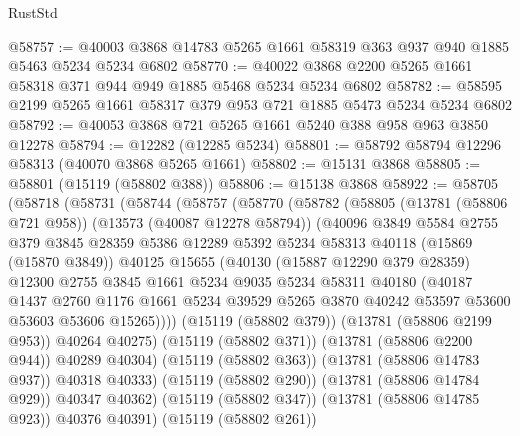 \begin{lexlean}{RustStd}
\begin{coremodule}
@58757 := @40003 @3868 @14783 @5265 @1661 @58319 @363 @937 @940 @1885 @5463 @5234 @5234 @6802
@58770 := @40022 @3868 @2200 @5265 @1661 @58318 @371 @944 @949 @1885 @5468 @5234 @5234 @6802
@58782 := @58595 @2199 @5265 @1661 @58317 @379 @953 @721 @1885 @5473 @5234 @5234 @6802
@58792 := @40053 @3868 @721 @5265 @1661 @5240 @388 @958 @963 @3850 @12278
@58794 := @12282 (@12285 @5234)
@58801 := @58792 @58794 @12296 @58313 (@40070 @3868 @5265 @1661)
@58802 := @15131 @3868
@58805 := @58801 (@15119 (@58802 @388))
@58806 := @15138 @3868
@58922 := @58705
    (@58718
      (@58731
        (@58744
          (@58757
            (@58770
              (@58782
                (@58805
                  (@13781 (@58806 @721 @958))
                  (@13573 (@40087 @12278 @58794))
                  (@40096
                    @3849
                    @5584
                    @2755
                    @379
                    @3845
                    @28359
                    @5386
                    @12289
                    @5392
                    @5234
                    @58313
                    @40118
                    (@15869 (@15870 @3849))
                    @40125
                    @15655
                    (@40130
                      (@15887 @12290 @379 @28359)
                      @12300
                      @2755
                      @3845
                      @1661
                      @5234
                      @9035
                      @5234
                      @58311
                      @40180
                      (@40187
                        @1437
                        @2760
                        @1176
                        @1661
                        @5234
                        @39529
                        @5265
                        @3870
                        @40242
                        @53597
                        @53600
                        @53603
                        @53606
                        @15265))))
                (@15119 (@58802 @379))
                (@13781 (@58806 @2199 @953))
                @40264
                @40275)
              (@15119 (@58802 @371))
              (@13781 (@58806 @2200 @944))
              @40289
              @40304)
            (@15119 (@58802 @363))
            (@13781 (@58806 @14783 @937))
            @40318
            @40333)
          (@15119 (@58802 @290))
          (@13781 (@58806 @14784 @929))
          @40347
          @40362)
        (@15119 (@58802 @347))
        (@13781 (@58806 @14785 @923))
        @40376
        @40391)
      (@15119 (@58802 @261))

\end{coremodule}
\end{lexlean}
